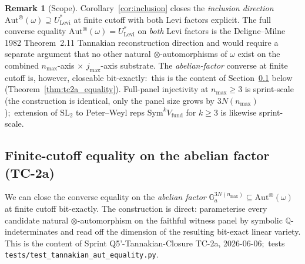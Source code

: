 \documentclass[11pt,a4paper]{article}
\theoremstyle{plain}
\theoremstyle{definition}
\newtheorem{remark}[theorem]{Remark}
\newcommand{\nmax}{n_{\max}}
\newcommand{\Aut}{\mathrm{Aut}}
\newcommand{\SL}{\mathrm{SL}}
\newcommand{\Ga}{\mathbb{G}_{a}}
\newcommand{\Q}{\mathbb{Q}}
\newcommand{\Ulev}{U^{*}_{\mathrm{Levi}}}
\newcommand{\fibfun}{\omega}
\begin{document}
\begin{remark}[Scope]\label{rem:inclusion_scope}
Corollary~\ref{cor:inclusion} closes the \emph{inclusion direction}
$\Aut^{\otimes}(\fibfun) \supseteq \Ulev$ at finite cutoff with both
Levi factors explicit. The full converse equality
$\Aut^{\otimes}(\fibfun) = \Ulev$ on \emph{both} Levi factors is the
Deligne--Milne 1982 Theorem~2.11 Tannakian reconstruction direction
and would require a separate argument that no other natural
$\otimes$-automorphisms of $\fibfun$ exist on the combined
$\nmax$-axis $\times$ $j_{\max}$-axis substrate. The
\emph{abelian-factor} converse at finite cutoff is, however,
closeable bit-exactly:\ this is the content of
Section~\ref{sec:tc2a_equality} below
(Theorem~\ref{thm:tc2a_equality}). Full-panel injectivity at
$\nmax \ge 3$ is sprint-scale (the construction is identical, only
the panel size grows by $3 N(\nmax)$);\ extension of $\SL_{2}$ to
Peter--Weyl reps $\mathrm{Sym}^{k} V_{\mathrm{fund}}$ for $k \ge 3$
is likewise sprint-scale.
\end{remark}

\subsection{Finite-cutoff equality on the abelian factor (TC-2a)}\label{sec:tc2a_equality}

We can close the converse equality on the \emph{abelian factor}
$\Ga^{3 N(\nmax)} \subseteq \Aut^{\otimes}(\fibfun)$ at finite
cutoff bit-exactly. The construction is direct: parameterise every
candidate natural $\otimes$-automorphism on the faithful witness
panel by symbolic $\Q$-indeterminates and read off the dimension of
the resulting bit-exact linear variety. This is the content of
Sprint Q5'-Tannakian-Closure TC-2a, 2026-06-06;\ tests
\texttt{tests/test\_tannakian\_aut\_equality.py}.
\end{document}
